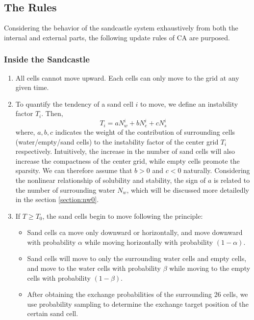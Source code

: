 \documentclass{mcmthesis}		    %
\begin{document}
 	
	\subsection{The Rules}\label{sec:rules}
	Considering the behavior of the sandcastle system exhaustively from both the internal and external parts, the following update rules of CA are purposed.
	\subsubsection{Inside the Sandcastle}
	\begin{enumerate}
	   \item All cells cannot move upward. Each cells can only move to the grid at any given time.
	   \item To quantify the tendency of a sand cell $i$ to move, we define an instability factor $T_i$. Then,
	   \begin{equation}\label{eq:unstability}
       T_{i}=a N_{w}^{i}+b N_{e}^{i}+c N_{s}^{i}
      \end{equation}
    where, $a, b, c$ indicates the weight of the contribution of surrounding cells (water/empty/sand cells) to the instability factor of the center grid $T_{i}$ respectively. Intuitively, the increase in the number of sand cells will also increase the compactness of the center grid, while empty cells promote the sparsity. We can therefore assume that $b>0$ and $c<0$ naturally. Considering the nonlinear relationship of solubility and stability, the sign of $a$ is related to the number of surrounding water $N_w$, which will be discussed more detailedly in the section \ref{section:nw0}.

\item If $T \geq T_0$, the sand cells begin to move following the principle:

\begin{itemize}

    \item Sand cells ca move only downward or horizontally, and move downward with probability $\alpha$ while moving horizontally with probability $(1-\alpha)$.

    \item Sand cells will move to only the surrounding water cells and empty cells, and move to the water cells with probability $\beta$ while moving to the empty cells with probability $(1-\beta)$.

    \item After obtaining the exchange probabilities of the surrounding 26 cells, we use probability sampling to determine the exchange target position of the certain sand cell.


\end{itemize}
\end{enumerate}
\end{document}
